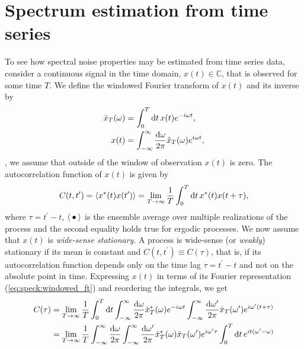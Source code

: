 \section{Spectrum estimation from time series}\label{sec:speck:theory:time_series_estimation}
To see how spectral noise properties may be estimated from time series data, consider a continuous signal in the time domain, $x(t)\in\mathbb{C}$, that is observed for some time $T$.
We define the windowed Fourier transform of $x(t)$ and its inverse by
\begin{align}
    \hat{x}_T(\omega) &= \int_{0}^{T}\dd{t} x(t)e^{-i\omega t} \label{eq:speck:windowed_ft}, \\
                 x(t) &= \int_{-\infty}^{\infty}\frac{\dd{\omega}}{2\pi}\hat{x}_T(\omega)e^{i\omega t}, \label{eq:speck:windowed_ft:inverse}
\end{align}
\ie, we assume that outside of the window of observation $x(t)$ is zero.
The autocorrelation function of $x(t)$ is given by
\begin{align}
    C(t, t^\prime) = \expval{x\conjugate(t) x(t^\prime)} = \lim_{T\to\infty} \frac{1}{T}\int_0^T\dd{t} x\conjugate(t) x(t + \tau), \label{eq:speck:autocorrelation}
\end{align}
where $\tau = t^\prime - t$, $\expval{\:\bullet\:}$ is the ensemble average over multiple realizations of the process and the second equality holds true for ergodic processes.
We now assume that $x(t)$ is \emph{wide-sense stationary}.
A process is wide-sense (or \emph{weakly}) stationary if its mean is constant and $C(t, t^\prime) \equiv C(\tau)$, that is, if its autocorrelation function depends only on the time lag $\tau = t^\prime - t$ and not on the absolute point in time.
Expressing $x(t)$ in terms of its Fourier representation (\cref{eq:speck:windowed_ft}) and reordering the integrals, we get
\begin{align}
    C(\tau) &= \lim_{T\to\infty}\frac{1}{T}\int_0^T\dd{t}
                \int_{-\infty}^{\infty}\frac{\dd{\omega}}{2\pi}\hat{x}_T^\ast(\omega)e^{-i\omega t}
                \int_{-\infty}^{\infty}\frac{\dd{\omega^\prime}}{2\pi}\hat{x}_T(\omega^\prime)e^{i\omega^\prime (t + \tau)} \\
            &= \lim_{T\to\infty}\frac{1}{T}\int_{-\infty}^{\infty}\frac{\dd{\omega}}{2\pi}\int_{-\infty}^{\infty}\frac{\dd{\omega^\prime}}{2\pi}
                \hat{x}_T^\ast(\omega)\hat{x}_T(\omega^\prime)e^{i\omega^\prime\tau}
                \int_0^T\dd{t}e^{i t (\omega^\prime - \omega)} \label{eq:speck:autocorrelation:fourier}
\end{align}
